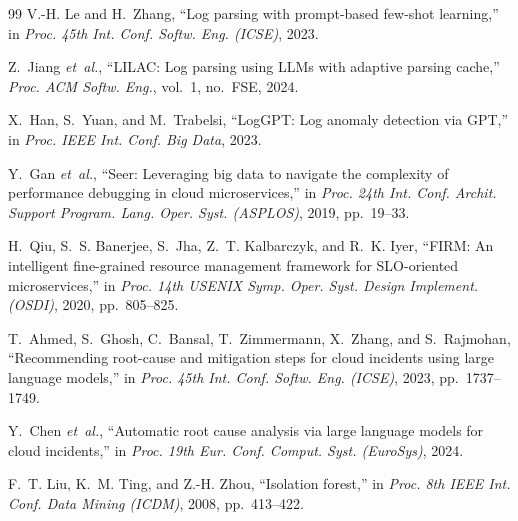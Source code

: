 \documentclass[journal]{IEEEtran}
\begin{document}
\begin{thebibliography}{99}
V.-H. Le and H.~Zhang, ``Log parsing with prompt-based few-shot learning,'' in \emph{Proc. 45th Int. Conf. Softw. Eng. (ICSE)}, 2023.

Z.~Jiang \emph{et~al.}, ``LILAC: Log parsing using LLMs with adaptive parsing cache,'' \emph{Proc. ACM Softw. Eng.}, vol.~1, no.~FSE, 2024.

X.~Han, S.~Yuan, and M.~Trabelsi, ``LogGPT: Log anomaly detection via GPT,'' in \emph{Proc. IEEE Int. Conf. Big Data}, 2023.

Y.~Gan \emph{et~al.}, ``Seer: Leveraging big data to navigate the complexity of performance debugging in cloud microservices,'' in \emph{Proc. 24th Int. Conf. Archit. Support Program. Lang. Oper. Syst. (ASPLOS)}, 2019, pp.~19--33.

H.~Qiu, S.~S. Banerjee, S.~Jha, Z.~T. Kalbarczyk, and R.~K. Iyer, ``FIRM: An intelligent fine-grained resource management framework for SLO-oriented microservices,'' in \emph{Proc. 14th USENIX Symp. Oper. Syst. Design Implement. (OSDI)}, 2020, pp.~805--825.

T.~Ahmed, S.~Ghosh, C.~Bansal, T.~Zimmermann, X.~Zhang, and S.~Rajmohan, ``Recommending root-cause and mitigation steps for cloud incidents using large language models,'' in \emph{Proc. 45th Int. Conf. Softw. Eng. (ICSE)}, 2023, pp.~1737--1749.

Y.~Chen \emph{et~al.}, ``Automatic root cause analysis via large language models for cloud incidents,'' in \emph{Proc. 19th Eur. Conf. Comput. Syst. (EuroSys)}, 2024.

F.~T. Liu, K.~M. Ting, and Z.-H. Zhou, ``Isolation forest,'' in \emph{Proc. 8th IEEE Int. Conf. Data Mining (ICDM)}, 2008, pp.~413--422.

\end{thebibliography}
\end{document}
